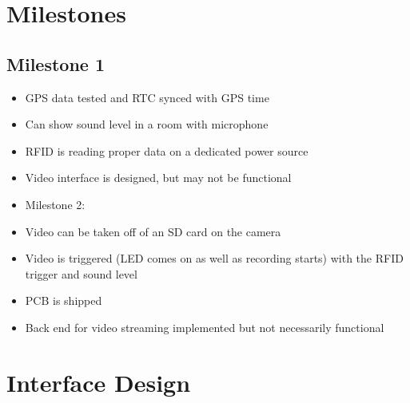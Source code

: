 \documentclass[12pt]{article}
\begin{document}
\section{Milestones}

\subsection{Milestone 1}
\begin{itemize}
    \item GPS data tested and RTC synced with GPS time
    \item Can show sound level in a room with microphone
    \item RFID is reading proper data on a dedicated power source
    \item Video interface is designed, but may not be functional
    \item Milestone 2:
    \item Video can be taken off of an SD card on the camera
    \item Video is triggered (LED comes on as well as recording starts) with the RFID trigger and sound level
    \item PCB is shipped
    \item Back end for video streaming implemented but not necessarily functional
\end{itemize}

\section{Interface Design}
\end{document}
